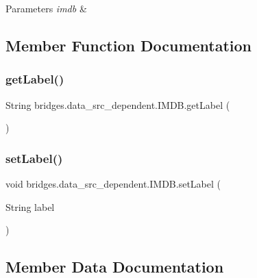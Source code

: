 \begin{DoxyParams}{Parameters}
{\em imdb} & \\
\hline
\end{DoxyParams}


\subsection{Member Function Documentation}
\hypertarget{classbridges_1_1data__src__dependent_1_1_i_m_d_b_ad2d0e1edabdb0596a3308c160f63cb2b}{}\label{classbridges_1_1data__src__dependent_1_1_i_m_d_b_ad2d0e1edabdb0596a3308c160f63cb2b} 
\subsubsection{\texorpdfstring{get\+Label()}{getLabel()}}
{\footnotesize\ttfamily String bridges.\+data\+\_\+src\+\_\+dependent.\+I\+M\+D\+B.\+get\+Label (\begin{DoxyParamCaption}{ }\end{DoxyParamCaption})}

\hypertarget{classbridges_1_1data__src__dependent_1_1_i_m_d_b_a9022297c43873b9df0ad6d3c91977bd8}{}\label{classbridges_1_1data__src__dependent_1_1_i_m_d_b_a9022297c43873b9df0ad6d3c91977bd8} 
\subsubsection{\texorpdfstring{set\+Label()}{setLabel()}}
{\footnotesize\ttfamily void bridges.\+data\+\_\+src\+\_\+dependent.\+I\+M\+D\+B.\+set\+Label (\begin{DoxyParamCaption}\item[{String}]{label }\end{DoxyParamCaption})}



\subsection{Member Data Documentation}
\hypertarget{classbridges_1_1data__src__dependent_1_1_i_m_d_b_a2913407abe6019a396d4a2ac086283df}{}\label{classbridges_1_1data__src__dependent_1_1_i_m_d_b_a2913407abe6019a396d4a2ac086283df} 
